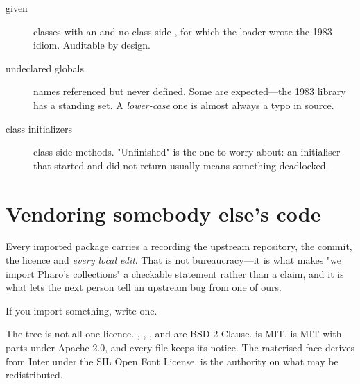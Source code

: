 \begin{description}
\item[given ] classes with an  and no class-side
  , for which the loader wrote the 1983 idiom. Auditable by design.
\item[undeclared globals] names referenced but never defined. Some are
  expected---the 1983 library has a standing set. A \emph{lower-case} one is
  almost always a typo in source.
\item[class initializers] class-side  methods. "Unfinished"
  is the one to worry about: an initialiser that started and did not return
  usually means something deadlocked.
\end{description}

\section{Vendoring somebody else's code}

Every imported package carries a  recording the upstream
repository, the commit, the licence and \emph{every local edit}. That is not
bureaucracy---it is what makes "we import Pharo's collections" a checkable
statement rather than a claim, and it is what lets the next person tell an
upstream bug from one of ours.

If you import something, write one.

\begin{stnote}[Licensing]
The tree is not all one licence. , , ,
 and  are BSD 2-Clause.  is MIT.
 is MIT with parts under Apache-2.0, and every file keeps its
notice. The rasterised face derives from Inter under the SIL Open Font
License.  is the authority on what may be redistributed.
\end{stnote}
